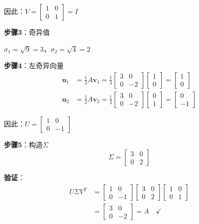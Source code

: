 \documentclass[12pt,a4paper]{article}
\begin{document}
因此：$V = \begin{bmatrix} 1 & 0 \\ 0 & 1 \end{bmatrix} = I$

\textbf{步骤3}：奇异值

$\sigma_1 = \sqrt{9} = 3$，$\sigma_2 = \sqrt{4} = 2$

\textbf{步骤4}：左奇异向量
\begin{align}
\bm{u}_1 &= \frac{1}{3} A \bm{v}_1 = \frac{1}{3} \begin{bmatrix} 3 & 0 \\ 0 & -2 \end{bmatrix} \begin{bmatrix} 1 \\ 0 \end{bmatrix} = \begin{bmatrix} 1 \\ 0 \end{bmatrix} \\
\bm{u}_2 &= \frac{1}{2} A \bm{v}_2 = \frac{1}{2} \begin{bmatrix} 3 & 0 \\ 0 & -2 \end{bmatrix} \begin{bmatrix} 0 \\ 1 \end{bmatrix} = \begin{bmatrix} 0 \\ -1 \end{bmatrix}
\end{align}

因此：$U = \begin{bmatrix} 1 & 0 \\ 0 & -1 \end{bmatrix}$

\textbf{步骤5}：构造$\Sigma$
\begin{equation}
\Sigma = \begin{bmatrix} 3 & 0 \\ 0 & 2 \end{bmatrix}
\end{equation}

\textbf{验证}：
\begin{align}
U\Sigma V^T &= \begin{bmatrix} 1 & 0 \\ 0 & -1 \end{bmatrix} \begin{bmatrix} 3 & 0 \\ 0 & 2 \end{bmatrix} \begin{bmatrix} 1 & 0 \\ 0 & 1 \end{bmatrix} \\
&= \begin{bmatrix} 3 & 0 \\ 0 & -2 \end{bmatrix} = A \quad \checkmark
\end{align}
\end{document}
